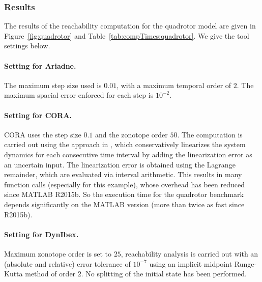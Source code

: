 \documentclass[EPiC]{easychair}
\begin{document}
\subsubsection{Results}


The results of the reachability computation for the quadrotor model are given in Figure~\ref{fig:quadrotor} and Table~\ref{tab:compTimes:quadrotor}. We give the tool settings below.

\paragraph{Setting for Ariadne.}
The maximum step size used is $0.01$, with a maximum temporal order of $2$. The maximum spacial error enforced for each step is $10^{-2}$.

\paragraph{Setting for CORA.}
CORA uses the step size $0.1$ and the zonotope order $50$. The computation is carried out using the approach in \cite{Althoff2008c}, which conservatively linearizes the system dynamics for each consecutive time interval by adding the linearization error as an uncertain input. The linearization error is obtained using the Lagrange remainder, which are evaluated via interval arithmetic. This results in many function calls (especially for this example), whose overhead has been reduced since MATLAB R2015b. So the execution time for the quadrotor benchmark depends significantly on the MATLAB version (more than twice as fast since R2015b).


\paragraph{Setting for DynIbex.} Maximum zonotope order is set to $25$, reachability analysis is carried out with an (absolute and relative) error tolerance of $10^{-7}$ using an implicit midpoint Runge-Kutta method of order $2$. No splitting of the initial state has been performed.
\end{document}

